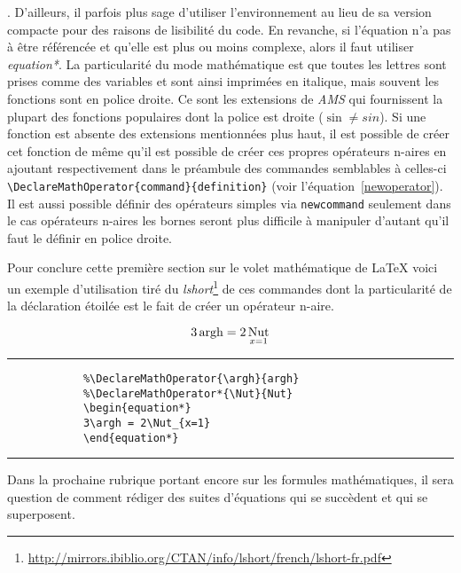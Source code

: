 	. D'ailleurs, il parfois plus sage d'utiliser l'environnement au lieu de sa version compacte pour des raisons de lisibilité du code. En revanche, si l'équation n'a pas à être référencée et qu'elle est plus ou moins complexe, alors il faut utiliser \textit{equation*}. La particularité du mode mathématique est que toutes les lettres sont prises comme des variables et sont ainsi imprimées en italique, mais souvent les fonctions sont en police droite. Ce sont les extensions de \textit{AMS} qui fournissent la plupart des fonctions populaires dont la police est droite ($\sin \neq sin$). %
	Si une fonction est absente des extensions mentionnées plus haut, il est possible de créer cet fonction de même qu'il est possible de créer ces propres opérateurs n-aires en ajoutant respectivement dans le préambule des commandes semblables à celles-ci \verb|\DeclareMathOperator{command}{definition}| (voir l'équation~\ref{newoperator}). Il est aussi possible définir des opérateurs simples via \verb|newcommand| seulement dans le cas opérateurs n-aires les bornes seront plus difficile à manipuler d'autant qu'il faut le définir en police droite. 
%
	\par Pour conclure cette première section sur le volet mathématique de \LaTeX{} voici un exemple d'utilisation tiré du \textit{lshort}\footnote{\url{http://mirrors.ibiblio.org/CTAN/info/lshort/french/lshort-fr.pdf}} de ces commandes dont la particularité de la déclaration étoilée est le fait de créer un opérateur n-aire. 
%	
	\begin{table}[H]
		\begin{equation}\label{newoperator}
		3\operatorname{argh} = 2\operatorname*{Nut}_{x=1}
		\end{equation}
		\hrule
		\begin{verbatim}
			%\DeclareMathOperator{\argh}{argh}
			%\DeclareMathOperator*{\Nut}{Nut}
			\begin{equation*}
			3\argh = 2\Nut_{x=1}
			\end{equation*}
		\end{verbatim}
		\hrule
	\end{table}
%
Dans la prochaine rubrique portant encore sur les formules mathématiques, il sera question de comment rédiger des suites d'équations qui se succèdent et qui se superposent.
